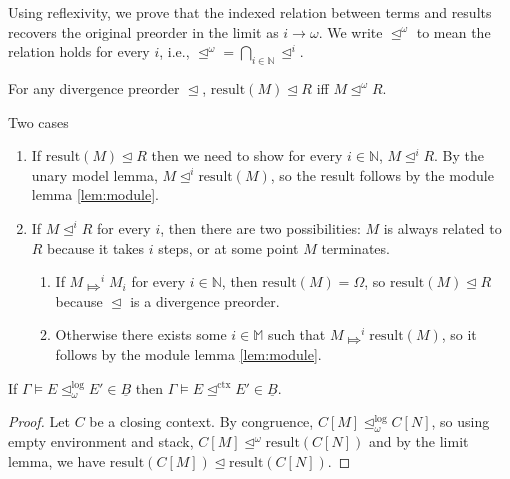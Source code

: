 \documentclass[acmsmall,screen,12pt]{acmart}
\renewcommand{\u}{\underline}
\newcommand{\apreorder}{\trianglelefteq}
\newcommand{\ctxize}[1]{\mathrel{{#1}^{\text{ctx}}}}
\newcommand{\ix}[2]{\mathrel{#1^{#2}}}
\newcommand{\ilrof}[2]{\mathrel{{#1}^{\text{log}}_{#2}}}
\newcommand{\bigstepsin}[1]{\mathrel{\Mapsto^{#1}}}
\newcommand{\diverge}{\Omega}
\newcommand{\result}{\text{result}}
\begin{document}
{\noindent Using reflexivity, we prove that the indexed relation between terms and
results recovers the original preorder in the limit as $i \to \omega$.
%
We write $\ix\apreorder \omega$ to mean the relation holds for every
$i$, i.e., $\ix\apreorder\omega =
\bigcap_{i\in\mathbb{N}} \ix\apreorder i$.
\begin{corollary}
  \label{lem:limit}
  For any divergence preorder $\apreorder$, \( \result(M) \apreorder
  R\) iff \( M \ix\apreorder \omega R \).
\end{corollary}
\begin{longproof}
  Two cases
  \begin{enumerate}
  \item If $\result(M) \apreorder R$ then we need to show for every $i
    \in \mathbb{N}$, $M \ix \apreorder i R$. By the unary model lemma,
    $M \ix\apreorder i \result(M)$, so the result follows by the
    module lemma \ref{lem:module}.
  \item If $M \ix\apreorder i R$ for every $i$, then there are two
    possibilities: $M$ is always related to $R$ because it takes $i$
    steps, or at some point $M$ terminates.
    \begin{enumerate}
    \item If $M \bigstepsin{i} M_i$ for every $i \in \mathbb{N}$, then
      $\result(M) = \diverge$, so $\result(M) \apreorder R$ because
      $\apreorder$ is a divergence preorder.
    \item Otherwise there exists some $i \in \mathbb{M}$ such that $M
      \bigstepsin{i} \result(M)$, so it follows by the module lemma
      \ref{lem:module}.
    \end{enumerate}
  \end{enumerate}
\end{longproof}

\begin{corollary} \label{lem:logical-implies-contextual}
  If $\Gamma \vDash E \ilrof\apreorder \omega E' \in \u B$
  then
  $\Gamma \vDash E \ctxize\apreorder E' \in \u B$.
\end{corollary}
\begin{proof}
  Let $C$ be a closing context. By congruence, $C[M] \ilrof\apreorder
  \omega C[N]$, so using empty environment and stack, $C[M]
  \ix\apreorder\omega \result(C[N])$ and by the limit lemma, we have
  $\result(C[M]) \apreorder \result(C[N])$.
\end{proof}

}
\end{document}
